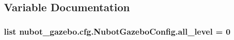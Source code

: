 \subsection{Variable Documentation}
\hypertarget{namespacenubot__gazebo_1_1cfg_1_1NubotGazeboConfig_a3a0649fc5f3abda5f7d733e81a02da97}{
\subsubsection[{all\-\_\-level}]{\setlength{\rightskip}{0pt plus 5cm}list nubot\-\_\-gazebo.\-cfg.\-Nubot\-Gazebo\-Config.\-all\-\_\-level = 0}}\label{namespacenubot__gazebo_1_1cfg_1_1NubotGazeboConfig_a3a0649fc5f3abda5f7d733e81a02da97}
